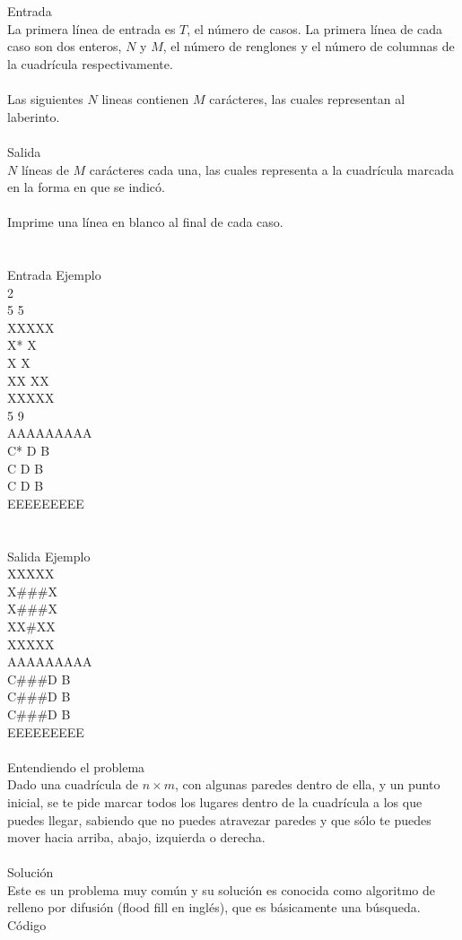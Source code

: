 \documentclass[12pt]{article}
\begin{document}
\\
\\
\textrm{\large Entrada}
\\
La primera línea de entrada es $T$, el número de casos. La primera línea de cada caso son dos enteros, $N$ y $M$, el número de renglones y el número de columnas de la cuadrícula respectivamente.\\
\\Las siguientes $N$ lineas contienen $M$ carácteres, las cuales representan al laberinto.\\
\\
\textrm{\large Salida}
\\
$N$ líneas de $M$ carácteres cada una, las cuales representa a la cuadrícula marcada en la forma en que se indicó.\\
\\Imprime una línea en blanco al final de cada caso.\\
\\
\\
\textrm{\large Entrada Ejemplo}
\\
2\\
5 5\\
XXXXX\\
X* X\\
X X\\
XX XX\\
XXXXX\\
5 9\\
AAAAAAAAA\\
C* D B\\
C D B\\
C D B\\
EEEEEEEEE\\
\\
\\
\textrm{\large Salida Ejemplo}
\\
XXXXX\\
X\#\#\#X\\
X\#\#\#X\\
XX\#XX\\
XXXXX\\
AAAAAAAAA\\
C\#\#\#D B\\
C\#\#\#D B\\
C\#\#\#D B\\
EEEEEEEEE\\
\\
\textrm{\large Entendiendo el problema}\\
Dado una cuadrícula de $n \times m$, con algunas paredes dentro de ella, y un punto inicial, se te pide marcar todos los lugares dentro de la cuadrícula a los que puedes llegar, sabiendo que no puedes atravezar paredes y que sólo te puedes mover hacia arriba, abajo, izquierda o derecha.\\
\\
\textrm{\large Solución}\\
Este es un problema muy común y su solución es conocida como algoritmo de relleno por difusión (flood fill en inglés), que es básicamente una búsqueda. 
\\
\textrm{\large Código}\\
\end{document}
